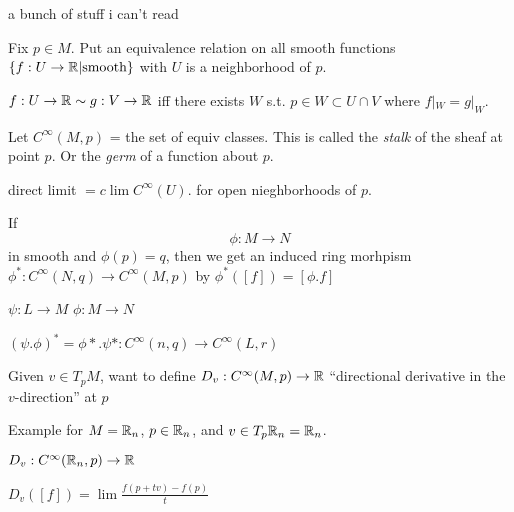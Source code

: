 \documentclass[11pt,leqno,oneside]{amsart}
\theoremstyle{mystyle} \newtheorem{thrm}[thm]{Theorem}
\theoremstyle{mystyle} \newtheorem{defi}[thm]{Definition}
\begin{document}
a bunch of stuff i can't read

Fix $p \in M$.
Put an equivalence relation on all smooth functions $\{ f : U \to {\mathbb R} | \text{smooth}\}$
with $U$ is a neighborhood of $p$.

$f:U \to {\mathbb R} \sim g:V \to {\mathbb R}$
iff
there exists $W$ s.t. $p \in W \subset U \cap V$ where $f|_W = g|_W$.

Let $C^\infty(M,p)$ = the set of equiv classes.  This is called the \emph{stalk} of the sheaf at point $p$.  Or the \emph{germ} of a function about $p$.

direct limit
$= c\lim C^\infty(U)$.
for open nieghborhoods of $p$.

If $$\phi: M \to N$$ in smooth and $\phi(p) = q$, then we get an induced ring morhpism
$\phi^* : C^\infty(N,q) \to C^\infty(M,p)$ by
$\phi^*([f]) = [\phi.f]$

$\psi : L \to M$
$\phi : M \to N$

$(\psi.\phi)^* = \phi*.\psi* : C^\infty(n,q) \to C^\infty(L,r)$

Given $v \in T_pM$, want to define
$D_v : C^\infty(M,p) \to {\mathbb R}$
``directional derivative in the $v$-direction'' at $p$

Example for $M = {\mathbb R}_n$, $p \in {\mathbb R}_n$, and $v \in T_p{\mathbb R}_n = {\mathbb R}_n$.

$D_v : C^\infty({\mathbb R}_n, p) \to {\mathbb R}$

$D_v([f]) = \lim \frac{f(p + tv) - f(p)}{t}$
\end{document}
